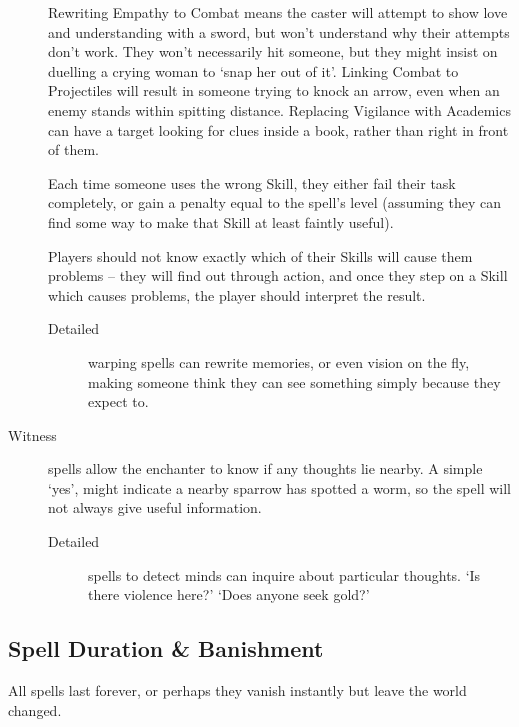 \begin{multicols}{2}
\begin{description}
    Rewriting Empathy to Combat means the caster will attempt to show love and understanding with a sword, but won't understand why their attempts don't work.
    They won't necessarily hit someone, but they might insist on duelling a crying woman to `snap her out of it'.
    Linking Combat to Projectiles will result in someone trying to knock an arrow, even when an enemy stands within spitting distance.
    Replacing Vigilance with Academics can have a target looking for clues inside a book, rather than right in front of them.

    Each time someone uses the wrong Skill, they either fail their task completely, or gain a penalty equal to the spell's level (assuming they can find some way to make that Skill at least faintly useful).

    Players should not know exactly which of their Skills will cause them problems -- they will find out through action, and once they step on a Skill which causes problems, the player should interpret the result.
    \begin{description}
      \item[Detailed]
        warping spells can rewrite memories, or even vision on the fly, making someone think they can see something simply because they expect to.
    \end{description}
  \item[Witness]
    spells allow the enchanter to know if any thoughts lie nearby.
    A simple `yes', might indicate a nearby sparrow has spotted a worm, so the spell will not always give useful information.
    \begin{description}
      \item[Detailed]
        spells to detect minds can inquire about particular thoughts.
        `Is there violence here?'
        `Does anyone seek gold?'
    \end{description}
\end{description}

\subsection{Spell Duration \& Banishment}

All spells last forever, or perhaps they vanish instantly but leave the world changed.


\end{multicols}
